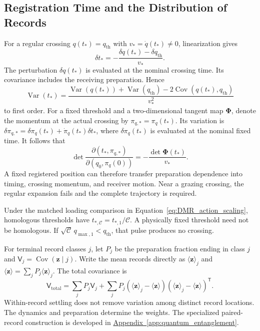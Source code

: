 \subsection{Registration Time and the Distribution of Records}

For a regular crossing $q(t_*)=q_{\mathrm{th}}$ with $v_*=\dot q(t_*)\neq0$, linearization gives
\begin{equation}
 \delta t_*=-\frac{\delta q(t_*)-\delta q_{\mathrm{th}}}{v_*}.
\end{equation}
The perturbation $\delta q(t_*)$ is evaluated at the nominal crossing time. Its covariance includes the receiving preparation. Hence
\begin{equation}
 \operatorname{Var}(t_*)=
 \frac{\operatorname{Var}(q(t_*))+\operatorname{Var}(q_{\mathrm{th}})
 -2\operatorname{Cov}(q(t_*),q_{\mathrm{th}})}{v_*^2}
\label{eq:DMR_event_variance}
\end{equation}
to first order. For a fixed threshold and a two-dimensional tangent map $\boldsymbol\Phi$, denote the momentum at the actual crossing by $\pi_{q,*}=\pi_q(t_*)$. Its variation is $\delta\pi_{q,*}=\delta\pi_q(t_*)+\dot\pi_q(t_*)\delta t_*$, where $\delta\pi_q(t_*)$ is evaluated at the nominal fixed time. It follows that
\begin{equation}
 \det\frac{\partial(t_*,\pi_{q,*})}{\partial(q_0,\pi_q(0))}
 =-\frac{\det\boldsymbol\Phi(t_*)}{v_*}.
\label{eq:DMR_event_map}
\end{equation}
A fixed registered position can therefore transfer preparation dependence into timing, crossing momentum, and receiver motion. Near a grazing crossing, the regular expansion fails and the complete trajectory is required.

Under the matched loading comparison in Equation~\eqref{eq:DMR_action_scaling}, homologous thresholds have $t_{*,\mathcal C}=t_{*,1}/\mathcal C$. A physically fixed threshold need not be homologous. If $\sqrt{\mathcal C}\,q_{\max,1}<q_{\mathrm{th}}$, that pulse produces no crossing.

For terminal record classes $j$, let $P_j$ be the preparation fraction ending in class $j$ and $\mathsf V_j=\operatorname{Cov}(\mathbf z\mid j)$. Write the mean records directly as $\langle\mathbf z\rangle_j$ and $\langle\mathbf z\rangle=\sum_jP_j\langle\mathbf z\rangle_j$. The total covariance is
\begin{equation}
 \mathsf V_{\mathrm{total}}=
 \sum_jP_j\mathsf V_j+
 \sum_jP_j(\langle\mathbf z\rangle_j-\langle\mathbf z\rangle)
 (\langle\mathbf z\rangle_j-\langle\mathbf z\rangle)^{\mathsf T}.
\label{eq:DMR_record_mixture}
\end{equation}
Within-record settling does not remove variation among distinct record locations. The dynamics and preparation determine the weights. The specialized paired-record construction is developed in \hyperref[app:quantum_entanglement]{Appendix~\ref*{app:quantum_entanglement}}.

